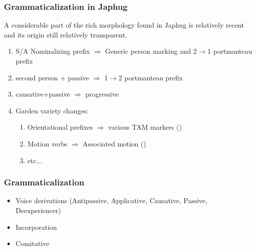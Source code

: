 \documentclass[xcolor=table]{beamer}
\begin{document}
  \begin{frame} 
 \frametitle{Grammaticalization in Japhug} 

A considerable part of the rich morphology found in Japhug is relatively recent and its origin still relatively transparent.

 \begin{enumerate}[<+->]
    \item S/A Nominalizing prefix $\Rightarrow$  Generic person marking and 2$\rightarrow$1 portmanteau prefix
   \item second person + passive $\Rightarrow$ 1$\rightarrow$2 portmanteau prefix
   \item causative+passive $\Rightarrow$ progressive
	\item Garden variety changes:
 \begin{enumerate}	
 \item Orientational prefixes $\Rightarrow$  various TAM markers (\citealt{jackson07irrealis, lin11direction, jacques14linking})
 \item Motion verbs $\Rightarrow$ Associated motion (\citealt{jacques13harmonization})
  \item etc...
  \end{enumerate}
 \end{enumerate}

  \end{frame}   

  \begin{frame} 
 \frametitle{Grammaticalization} 
 \begin{itemize}
\item Voice derivations (Antipassive, Applicative, Causative, Passive, Deexperiencer)
\item Incorporation
\item Comitative
\end{itemize}
\end{frame}   
\end{document}
